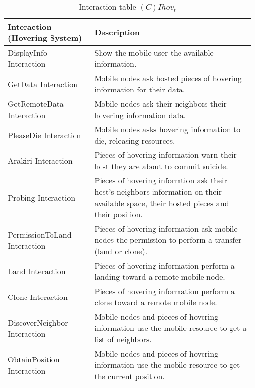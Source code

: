\begin{table}[H]
	\centering
	\begin{tabular}{|p{4cm}|p{8cm}|}
			\hline
			\textbf{Interaction (Hovering System)} & \textbf{Description} \\
			\hline
			DisplayInfo Interaction & Show the mobile user the available information. \\
			\hline
			GetData Interaction & Mobile nodes ask hosted pieces of hovering information for their data. \\
			\hline
      GetRemoteData Interaction & Mobile nodes ask their neighbors their hovering information data. \\
			\hline
			PleaseDie Interaction & Mobile nodes asks hovering information to die, releasing resources. \\
			\hline
			Arakiri Interaction & Pieces of hovering information warn their host they are about to commit suicide. \\
			\hline
      Probing Interaction & Pieces of hovering informtion ask their
            host's neighbors information on their available space, their hosted
            pieces and their position. \\
			\hline
      PermissionToLand Interaction & Pieces of hovering information ask mobile
      nodes the permission to perform a transfer (land or clone). \\
			\hline
      Land Interaction & Pieces of hovering information perform a landing toward a remote mobile node. \\
			\hline
      Clone Interaction & Pieces of hovering information perform a clone toward a remote mobile node. \\
			\hline
      DiscoverNeighbor Interaction & Mobile nodes and pieces of hovering
      information use the mobile resource to get a list of neighbors. \\
			\hline
      ObtainPosition Interaction & Mobile nodes and pieces of hovering
      information use the mobile resource to get the current position. \\
			\hline
		\end{tabular}
	\caption{Interaction table $(C)Ihov_t$}
	\label{tab:cihovt}
\end{table}

